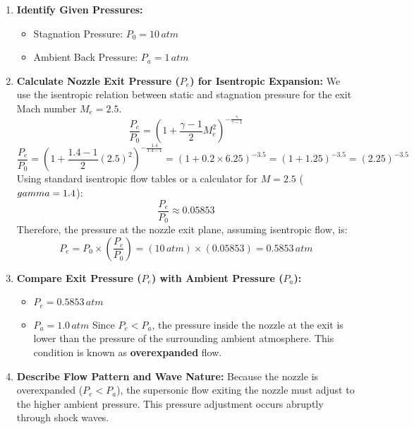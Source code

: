 \begin{enumerate}
\def\labelenumi{\arabic{enumi}.}
\item
  \textbf{Identify Given Pressures:}

  \begin{itemize}
  \tightlist
  \item
    Stagnation Pressure: \(P_0 = 10 \, atm\)
  \item
    Ambient Back Pressure: \(P_a = 1 \, atm\)
  \end{itemize}
\item
  \textbf{Calculate Nozzle Exit Pressure (\(P_e\)) for Isentropic
  Expansion:} We use the isentropic relation between static and
  stagnation pressure for the exit Mach number \(M_e = 2.5\).
  \[ \frac{P_e}{P_0} = \left( 1 + \frac{\gamma-1}{2} M_e^2 \right)^{-\frac{\gamma}{\gamma-1}} \]
  \[ \frac{P_e}{P_0} = \left( 1 + \frac{1.4-1}{2} (2.5)^2 \right)^{-\frac{1.4}{1.4-1}} = (1 + 0.2 \times 6.25)^{-3.5} = (1 + 1.25)^{-3.5} = (2.25)^{-3.5} \]
  Using standard isentropic flow tables or a calculator for \(M=2.5\)
  (\(\\gamma=1.4\)): \[ \frac{P_e}{P_0} \approx 0.05853 \] Therefore,
  the pressure at the nozzle exit plane, assuming isentropic flow, is:
  \[ P_e = P_0 \times \left( \frac{P_e}{P_0} \right) = (10 \, atm) \times (0.05853) = 0.5853 \, atm \]
\item
  \textbf{Compare Exit Pressure (\(P_e\)) with Ambient Pressure
  (\(P_a\)):}

  \begin{itemize}
  \tightlist
  \item
    \(P_e = 0.5853 \, atm\)
  \item
    \(P_a = 1.0 \, atm\) Since \(P_e < P_a\), the pressure inside the
    nozzle at the exit is lower than the pressure of the surrounding
    ambient atmosphere. This condition is known as \textbf{overexpanded}
    flow.
  \end{itemize}
\item
  \textbf{Describe Flow Pattern and Wave Nature:} Because the nozzle is
  overexpanded (\(P_e < P_a\)), the supersonic flow exiting the nozzle
  must adjust to the higher ambient pressure. This pressure adjustment
  occurs abruptly through shock waves.


\end{enumerate}
